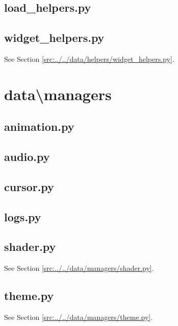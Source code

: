 \documentclass[../main/main.tex]{subfiles}
\begin{document}
\subsection{load\_helpers.py}

\label{src:data/helpers/load_helpers.py}

\subsection{widget\_helpers.py}
See Section \ref{src:../../data/helpers/widget_helpers.py}.

\section{data\textbackslash managers}
\subsection{animation.py}

\label{src:data/managers/animation.py}

\subsection{audio.py}

\label{src:data/managers/audio.py}

\subsection{cursor.py}

\label{src:data/managers/cursor.py}

\subsection{logs.py}

\label{src:data/managers/logs.py}

\subsection{shader.py}
See Section \ref{src:../../data/managers/shader.py}.

\subsection{theme.py}
See Section \ref{src:../../data/managers/theme.py}.
\end{document}
